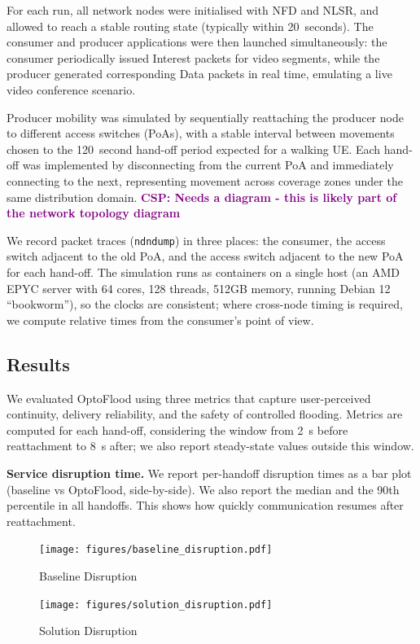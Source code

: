 \documentclass[10pt,conference]{IEEEtran}
\newcommand{\csp}[1]{\textbf{\textcolor{purple}{CSP: #1}}}
\begin{document}
For each run, all network nodes were initialised with NFD and NLSR, and allowed to reach a stable routing state (typically within 20~seconds). The consumer and producer applications were then launched simultaneously: the consumer periodically issued Interest packets for video segments, while the producer generated corresponding Data packets in real time, emulating a live video conference scenario.

Producer mobility was simulated by sequentially reattaching the producer node to different access switches (PoAs), with a stable interval between movements chosen to the 120~second hand-off period expected for a walking UE. Each hand-off was implemented by disconnecting from the current PoA and immediately connecting to the next, representing movement across coverage zones under the same distribution domain.
\csp{Needs a diagram - this is likely part of the network topology diagram}


We record packet traces (\texttt{ndndump}) in three places: the consumer, the access switch adjacent to the old PoA, and the access switch adjacent to the new PoA for each hand-off. 
The simulation runs as containers on a single host (an AMD EPYC server with 64 cores, 128 threads, 512GB memory, running Debian 12 ``bookworm''), so the clocks are consistent; where cross-node timing is required, we compute relative times from the consumer’s point of view.


\subsection{Results}

We evaluated OptoFlood using three metrics that capture user-perceived continuity, delivery reliability, and the safety of controlled flooding. 
Metrics are computed for each hand-off, considering the window from 2~s before reattachment to 8~s after; we also report steady-state values outside this window.

\textbf{Service disruption time.}
We report per-handoff disruption times as a bar plot (baseline vs OptoFlood, side-by-side). We also report the median and the 90th percentile in all handoffs. This shows how quickly communication resumes after reattachment.
\begin{figure}
    \centering
    \texttt{[image: figures/baseline\_disruption.pdf]}
    \caption{Baseline Disruption}
    \label{fig:baseline_disruption}
\end{figure}
\begin{figure}
    \centering
    \texttt{[image: figures/solution\_disruption.pdf]}
    \caption{Solution Disruption}
    \label{fig:solution_disruption}
\end{figure}
\end{document}
